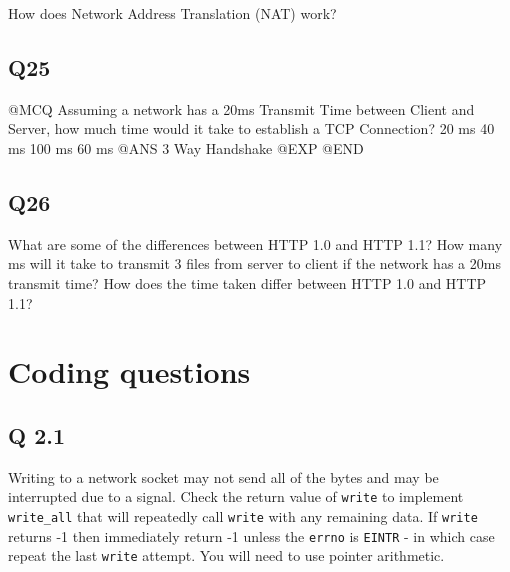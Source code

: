How does Network Address Translation (NAT) work?

\subsection{Q25}\label{q25}

@MCQ Assuming a network has a 20ms Transmit Time between Client and
Server, how much time would it take to establish a TCP Connection? 20 ms
40 ms 100 ms 60 ms @ANS 3 Way Handshake @EXP @END

\subsection{Q26}\label{q26}

What are some of the differences between HTTP 1.0 and HTTP 1.1? How many
ms will it take to transmit 3 files from server to client if the network
has a 20ms transmit time? How does the time taken differ between HTTP
1.0 and HTTP 1.1?

\hypertarget{coding-questions}{\section{Coding
questions}\label{coding-questions}}

\subsection{Q 2.1}\label{q-2.1-1}

Writing to a network socket may not send all of the bytes and may be
interrupted due to a signal. Check the return value of \texttt{write} to
implement \texttt{write\_all} that will repeatedly call \texttt{write}
with any remaining data. If \texttt{write} returns -1 then immediately
return -1 unless the \texttt{errno} is \texttt{EINTR} - in which case
repeat the last \texttt{write} attempt. You will need to use pointer
arithmetic.

\begin{Shaded}
\begin{Highlighting}[]
   
   
\NormalTok{\}}
\end{Highlighting}
\end{Shaded}

